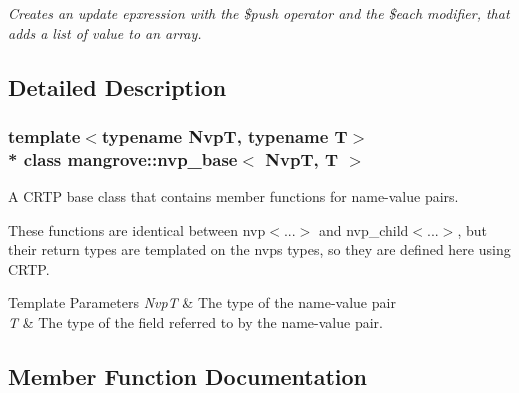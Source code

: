 \begin{DoxyCompactItemize}
\begin{DoxyCompactList}\small\item\em Creates an update epxression with the \$push operator and the \$each modifier, that adds a list of value to an array. \end{DoxyCompactList}\end{DoxyCompactItemize}


\subsection{Detailed Description}
\subsubsection*{template$<$typename NvpT, typename T$>$\\*
class mangrove\+::nvp\+\_\+base$<$ Nvp\+T, T $>$}

A C\+R\+TP base class that contains member functions for name-\/value pairs. 

These functions are identical between nvp$<$...$>$ and nvp\+\_\+child$<$...$>$, but their return types are templated on the nvp\textquotesingle{}s types, so they are defined here using C\+R\+TP. 
\begin{DoxyTemplParams}{Template Parameters}
{\em NvpT} & The type of the name-\/value pair \\
\hline
{\em T} & The type of the field referred to by the name-\/value pair. \\
\hline
\end{DoxyTemplParams}


\subsection{Member Function Documentation}
